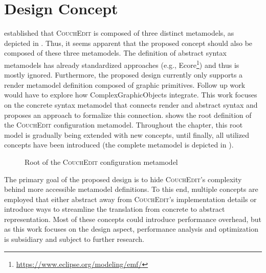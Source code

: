 \chapter{Design Concept}
\label{ch:design}
 established that \textsc{CouchEdit} is composed of three distinct metamodels, as depicted in . Thus, it seems apparent that the proposed concept should also be composed of these three metamodels. The definition of abstract syntax metamodels has already standardized approaches (e.g., Ecore\footnote{\url{https://www.eclipse.org/modeling/emf/}}) and thus is mostly ignored. Furthermore, the proposed design currently only supports a render metamodel definition composed of graphic primitives. Follow up work would have to explore how ComplexGraphicObjects integrate.  This work focuses on the concrete syntax metamodel that connects render and abstract syntax and proposes an approach to formalize this connection.  shows the root definition of the \textsc{CouchEdit} configuration metamodel. Throughout the chapter, this root model is gradually being extended with new concepts, until finally, all utilized concepts have been introduced (the complete metamodel is depicted in ).

\begin{figure}[ht]
  \centering
  
  \caption{Root of the \textsc{CouchEdit} configuration metamodel}
  \label{fig:metamodel-base}
\end{figure}

The primary goal of the proposed design is to hide \textsc{CouchEdit}'s complexity behind more accessible metamodel definitions. To this end, multiple concepts are employed that either abstract away from \textsc{CouchEdit}'s implementation details or introduce ways to streamline the translation from concrete to abstract representation. Most of these concepts could introduce performance overhead, but as this work focuses on the design aspect, performance analysis and optimization is subsidiary and subject to further research.

